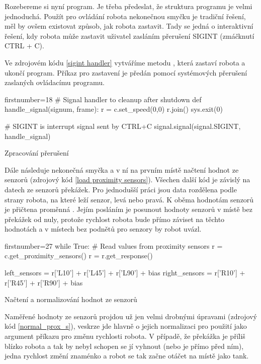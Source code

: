 Rozebereme si nyní program. Je třeba předeslat, že struktura programu je velmi
jednoduchá. Použít pro ovládání robota nekonečnou smyčku je tradiční řešení,
měl by ovšem existovat způsob, jak robota zastavit. Tady se jedná o
interaktivní řešení, kdy robota může zastavit uživatel zasláním přerušení
SIGINT (zmáčknutí CTRL + C).

Ve zdrojovém kódu \ref{sigint handler} vytváříme metodu ,
která zastaví robota a ukončí program. Příkaz pro zastavení je předán pomocí
systémových přerušení zaslaných ovládacímu programu.

\begin{listing}[H]
\begin{pyc*}{firstnumber=18}
# Signal handler to cleanup after shutdown
def handle_signal(signum, frame):
    r = c.set_speed(0,0)
    r.join()
    sys.exit(0)

# SIGINT is interrupt signal sent by CTRL+C
signal.signal(signal.SIGINT, handle_signal)
\end{pyc*}
\caption{Zpracování přerušení}
\label{sigint handler}
\end{listing}

Dále následuje nekonečná smyčka a v ní na prvním místě načtení hodnot ze
senzorů (zdrojový kód  \ref{load proximity sensors}). Všechen další kód je
závislý na datech ze senzorů překážek. Pro jednodušší práci jsou data rozdělena
podle strany robota, na které leží senzor, levá nebo pravá. K oběma hodnotám
senzorů je přičtena proměnná . Jejím posláním je posunout hodnoty
senzorů v místě bez překážek od nuly, protože rychlost robota bude přímo
záviset na těchto hodnotách a v místech bez podnětů pro senzory by robot uvázl.

\begin{listing}[H]
\begin{pyc*}{firstnumber=27}
while True:
    # Read values from proximity sensors
    r = c.get_proximity_sensors()
    r = r.get_response()

    left_sensors = r['L10'] + r['L45'] + r['L90'] + bias
    right_sensors = r['R10'] + r['R45'] + r['R90'] + bias
\end{pyc*}
\caption{Načtení a normalizování hodnot ze senzorů}
\label{load proximity sensors}
\end{listing}

Naměřené hodnoty ze senzorů projdou už jen velmi drobnými úpravami (zdrojový
kód \ref{normal_prox_s}), veskrze jde hlavně o jejich
normalizaci pro použití jako argument příkazu pro změnu rychlosti robota. V
případě, že překážka je příliš blízko robota a tak by nebyl schopen se jí
vyhnout (nebo je přímo před ním), jedna rychlost změní znaménko a robot se tak
začne otáčet na místě jako tank.

